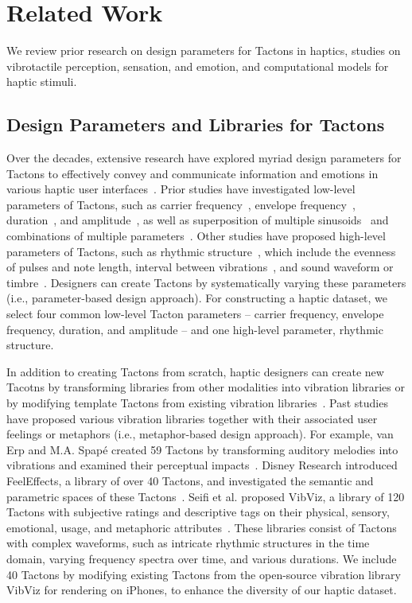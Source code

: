 \section{Related Work}
We review prior research on design parameters for Tactons in haptics, studies on vibrotactile perception, sensation, and emotion, and computational models for haptic stimuli.


\subsection{Design Parameters and Libraries for Tactons}
Over the decades, extensive research have explored myriad design parameters for Tactons to effectively convey and communicate information and emotions in various haptic user interfaces~\cite{maclean2008foundations}.
Prior studies have investigated low-level parameters of Tactons, such as carrier frequency~\cite{hwang2010perceptual, israr2006frequency}, envelope frequency~\cite{park2011perceptual, lim2023can}, duration~\cite{kwon2023can, yoo2015emotional}, and amplitude~\cite{hwang2010perceptual, israr2006frequency}, as well as superposition of multiple sinusoids~\cite{yoo2022perceived, hwang2017perceptual} and combinations of multiple parameters~\cite{yoo2015emotional, lim2023can}.
Other studies have proposed high-level parameters of Tactons, such as rhythmic structure~\cite{ternes2008designing, brown2006multidimensional, abou2022vibrotactile}, which include the evenness of pulses and note length, interval between vibrations~\cite{tan2019user}, and sound waveform or timbre~\cite{brown2007tactons, brown2005first}.
Designers can create Tactons by systematically varying these parameters (i.e., parameter-based design approach).
For constructing a haptic dataset, we select four common low-level Tacton parameters -- carrier frequency, envelope frequency, duration, and amplitude -- and one high-level parameter, rhythmic structure.


In addition to creating Tactons from scratch, haptic designers can create new Tacotns by transforming libraries from other modalities into vibration libraries or by modifying template Tactons from existing vibration libraries~\cite{schneider2016studying}.
Past studies have proposed various vibration libraries together with their associated user feelings or metaphors (i.e., metaphor-based design approach).
For example, van Erp and M.A. Spap\'e created 59 Tactons by transforming auditory melodies into vibrations and examined their perceptual impacts~\cite{van2003distilling}.
Disney Research introduced FeelEffects, a library of over 40 Tactons, and investigated the semantic and parametric spaces of these Tactons~\cite{israr2014feel}.
Seifi et al. proposed VibViz, a library of 120 Tactons with subjective ratings and descriptive tags on their physical, sensory, emotional, usage, and metaphoric attributes~\cite{seifi2015vibviz}.
These libraries consist of Tactons with complex waveforms, such as intricate rhythmic structures in the time domain, varying frequency spectra over time, and various durations.
We include 40 Tactons by modifying existing Tactons from the open-source vibration library VibViz for rendering on iPhones, to enhance the diversity of our haptic dataset.


